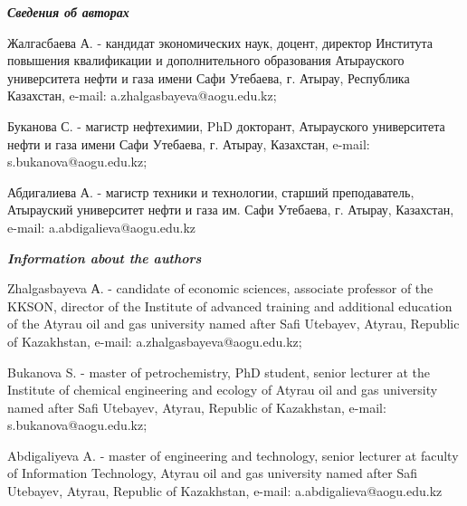 \begin{authorinfo}
\emph{{\bfseries Сведения об авторах}}

Жалгасбаева А. - кандидат экономических наук, доцент, директор Института
повышения квалификации и дополнительного образования Атырауского
университета нефти и газа имени Сафи Утебаева, г. Атырау, Республика
Казахстан, e-mail: a.zhalgasbayeva@aogu.edu.kz; 

Буканова С. - магистр нефтехимии, PhD докторант, Атырауского
университета нефти и газа имени Сафи Утебаева, г. Атырау, Казахстан,
e-mail: s.bukanova@aogu.edu.kz;

Абдигалиева А. - магистр техники и технологии, старший преподаватель,
Атырауский университет нефти и газа им. Сафи Утебаева, г. Атырау,
Казахстан,
e-mail: a.abdigalieva@aogu.edu.kz

\emph{{\bfseries Information about the authors}}

Zhalgasbayeva А. - candidate of economic sciences, associate professor
of the KKSON, director of the Institute of advanced training and
additional education of the Atyrau oil and gas university named after
Safi Utebayev, Atyrau, Republic of Kazakhstan,
e-mail: a.zhalgasbayeva@aogu.edu.kz; 

Bukanova S. - master of petrochemistry, PhD student, senior lecturer at
the Institute of chemical engineering and ecology of Atyrau oil and gas
university named after Safi Utebayev, Atyrau, Republic of Kazakhstan,
e-mail: s.bukanova@aogu.edu.kz;

Abdigaliyeva A. - master of engineering and technology, senior lecturer
at faculty of Information Technology, Atyrau oil and gas university
named after Safi Utebayev, Atyrau, Republic of Kazakhstan,
e-mail: a.abdigalieva@aogu.edu.kz
\end{authorinfo}

